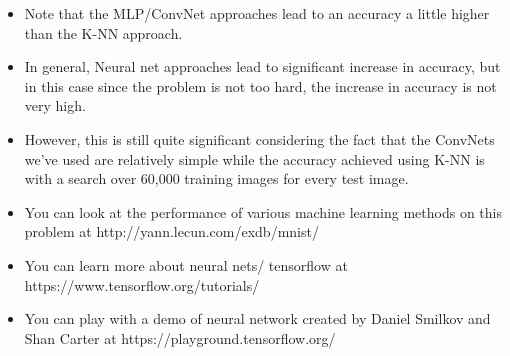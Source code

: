 \documentclass[11pt]{article}
\providecommand{\tightlist}{%
      \setlength{\itemsep}{0pt}\setlength{\parskip}{0pt}}
\begin{document}
    \begin{itemize}
\tightlist
\item
  Note that the MLP/ConvNet approaches lead to an accuracy a little
  higher than the K-NN approach.
\item
  In general, Neural net approaches lead to significant increase in
  accuracy, but in this case since the problem is not too hard, the
  increase in accuracy is not very high.
\item
  However, this is still quite significant considering the fact that the
  ConvNets we've used are relatively simple while the accuracy achieved
  using K-NN is with a search over 60,000 training images for every test
  image.
\item
  You can look at the performance of various machine learning methods on
  this problem at http://yann.lecun.com/exdb/mnist/
\item
  You can learn more about neural nets/ tensorflow at
  https://www.tensorflow.org/tutorials/
\item
  You can play with a demo of neural network created by Daniel Smilkov
  and Shan Carter at https://playground.tensorflow.org/
\end{itemize}


    
    
    
    
\end{document}
